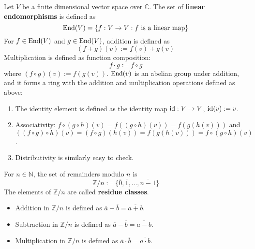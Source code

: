 \begin{example}
	Let $V$ be a finite dimensional vector space over $\mathbb{C}$. The set of \textbf{linear endomorphisms} is defined as
	\[
		\text{End}(V) = \{ f: V \rightarrow V : f \text{ is a linear map} \}
	\]
	For $f \in \text{End}(V)$ and $g \in \text{End}(V)$, addition is defined as
	\[
		(f + g)(v) := f(v) + g(v)
	\]
	Multiplication is defined as function composition:
	\[
		f \cdot g := f \circ g
	\]
	where $(f \circ g)(v) := f(g(v))$. $\text{End}(v)$ is an abelian group under addition, and it forms a ring with the addition and multiplication operations defined as above:
	\begin{enumerate}
		\item The identity element is defined as the identity map $\text{id}: V \rightarrow V$, $\text{id}(v) := v$.
		\item Associativity: $f \circ (g \circ h) (v) = f((g \circ h)(v)) = f(g(h(v)))$ and $((f \circ g) \circ h) (v) = (f \circ g) (h(v)) = f(g(h(v))) = f \circ (g \circ h) (v)$.
		\item Distributivity is similarly easy to check.
	\end{enumerate}
\end{example}

\begin{definition}
	For $n \in \mathbb{N}$, the set of remainders modulo $n$ is
	\[
		\mathbb{Z} / n := \{ \bar{0}, \bar{1}, \dots, \overline{n - 1} \}
	\]
	The elements of $\mathbb{Z} / n$ are called \textbf{residue classes}.
\end{definition}

\begin{definition}
	\hfill
	\begin{itemize}
		\item Addition in $\mathbb{Z} / n$ is defined as $\overline{a} + \overline{b} = \overline{a + b}$.
		\item Subtraction in $\mathbb{Z} / n$ is defined as $\overline{a} - \overline{b} = \overline{a - b}$.
		\item Multiplication in $\mathbb{Z} / n$ is defined as $\overline{a} \cdot \overline{b} = \overline{a \cdot b}$.
	\end{itemize}
\end{definition}

